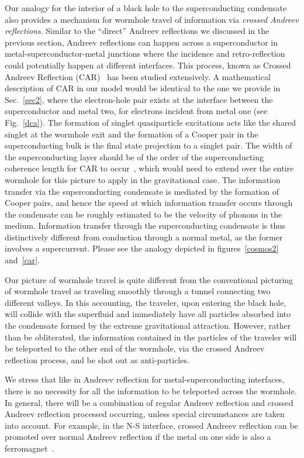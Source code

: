 \documentclass[10pt,letterpaper,aps,onecolumn,superscriptaddress,floatfix,notitlepage]{revtex4-1}
\begin{document}
	Our analogy for the interior of a black hole to the superconducting condensate also provides a mechanism for wormhole travel of information via \textit{crossed Andreev reflections}.  Similar to the ``direct'' Andreev reflections we discussed in the previous section, Andreev reflections can happen across a superconductor in metal-superconductor-metal junctions where the incidence and retro-reflection could potentially happen at different interfaces. This process, known as Crossed Andreev Reflection (CAR)~\cite{car} has been studied extensively. A mathematical description of CAR in our model would be identical to the one we provide in Sec.~\ref{sec2}, where the electron-hole pair exists at the interface between the superconductor and metal two, for electrons incident from metal one (see Fig.~\ref{dca}). The formation of singlet quasiparticle excitations acts like the shared singlet at the wormhole exit and the formation of a Cooper pair in the superconducting bulk is the final state projection to a singlet pair. The width of the superconducting layer should be of the order of the superconducting coherence length for CAR to occur~\cite{car}, which would need to extend over the entire wormhole for this picture to apply in the gravitational case. The information transfer via the superconducting condensate is mediated by the formation of Cooper pairs, and hence the speed at which information transfer occurs through the condensate can be roughly estimated to be the velocity of phonons in the medium. Information transfer through the superconducting condensate is thus distinctively different from conduction through a normal metal, as the former involves a supercurrent. Please see the analogy depicted in figures~\ref{cosmos2} and~\ref{car}.
	
	Our picture of wormhole travel is quite different from the conventional picturing of wormhole travel as traveling smoothly through a tunnel connecting two different valleys.  In this accounting, the traveler, upon entering the black hole, will collide with the superfluid and immediately have all particles absorbed into the condensate formed by the extreme gravitational attraction.  However, rather than be obliterated, the information contained in the particles of the traveler will be teleported to the other end of the wormhole, via the crossed Andreev reflection process, and be shot out as anti-particles.    
	
	We stress that like in Andreev reflection for metal-superconducting interfaces, there is no necessity for all the information to be teleported across the wormhole.  In general, there will be a combination of regular Andreev reflection and crossed Andreev reflection processed occurring, unless special circumstances are taken into account.  For example, in the N-S interface, crossed Andreev reflection can be promoted over normal Andreev reflection if the metal on one side is also a ferromagnet~\cite{cadden2007charge}.
	
\end{document}
